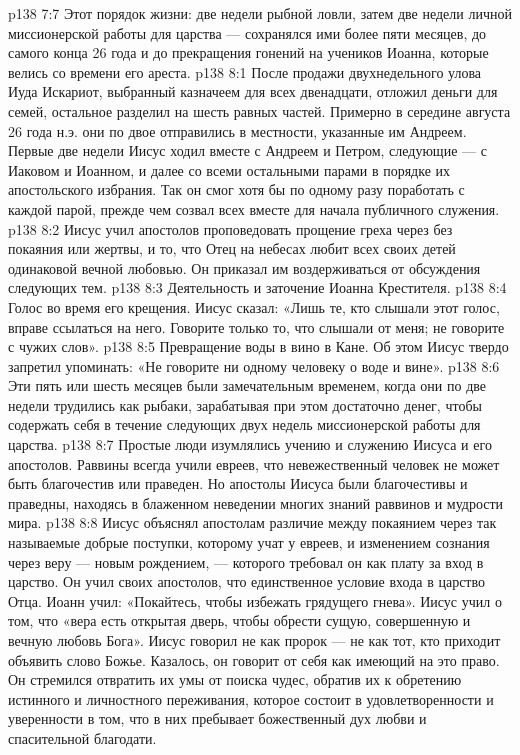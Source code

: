 \vs p138 7:7 Этот порядок жизни: две недели рыбной ловли, затем две недели личной миссионерской работы для царства --- сохранялся ими более пяти месяцев, до самого конца 26 года и до прекращения гонений на учеников Иоанна, которые велись со времени его ареста.
\vs p138 8:1 После продажи двухнедельного улова Иуда Искариот, выбранный казначеем для всех двенадцати, отложил деньги для семей, остальное разделил на шесть равных частей. Примерно в середине августа 26 года н.э. они по двое отправились в местности, указанные им Андреем. Первые две недели Иисус ходил вместе с Андреем и Петром, следующие --- с Иаковом и Иоанном, и далее со всеми остальными парами в порядке их апостольского избрания. Так он смог хотя бы по одному разу поработать с каждой парой, прежде чем созвал всех вместе для начала публичного служения.
\vs p138 8:2 Иисус учил апостолов проповедовать прощение греха через  без покаяния или жертвы, и то, что Отец на небесах любит всех своих детей одинаковой вечной любовью. Он приказал им воздерживаться от обсуждения следующих тем.
\vs p138 8:3 \bibnobreakspace Деятельность и заточение Иоанна Крестителя.
\vs p138 8:4 \bibnobreakspace Голос во время его крещения. Иисус сказал: «Лишь те, кто слышали этот голос, вправе ссылаться на него. Говорите только то, что слышали от меня; не говорите с чужих слов».
\vs p138 8:5 \bibnobreakspace Превращение воды в вино в Кане. Об этом Иисус твердо запретил упоминать: «Не говорите ни одному человеку о воде и вине».
\vs p138 8:6 \pc Эти пять или шесть месяцев были замечательным временем, когда они по две недели трудились как рыбаки, зарабатывая при этом достаточно денег, чтобы содержать себя в течение следующих двух недель миссионерской работы для царства.
\vs p138 8:7 Простые люди изумлялись учению и служению Иисуса и его апостолов. Раввины всегда учили евреев, что невежественный человек не может быть благочестив или праведен. Но апостолы Иисуса были благочестивы и праведны, находясь в блаженном неведении многих знаний раввинов и мудрости мира.
\vs p138 8:8 \pc Иисус объяснял апостолам различие между покаянием через так называемые добрые поступки, которому учат у евреев, и изменением сознания через веру --- новым рождением, --- которого требовал он как плату за вход в царство. Он учил своих апостолов, что  единственное условие входа в царство Отца. Иоанн учил: «Покайтесь, чтобы избежать грядущего гнева». Иисус учил о том, что «вера есть открытая дверь, чтобы обрести сущую, совершенную и вечную любовь Бога». Иисус говорил не как пророк --- не как тот, кто приходит объявить слово Божье. Казалось, он говорит от себя как имеющий на это право. Он стремился отвратить их умы от поиска чудес, обратив их к обретению истинного и личностного переживания, которое состоит в удовлетворенности и уверенности в том, что в них пребывает божественный дух любви и спасительной благодати.
